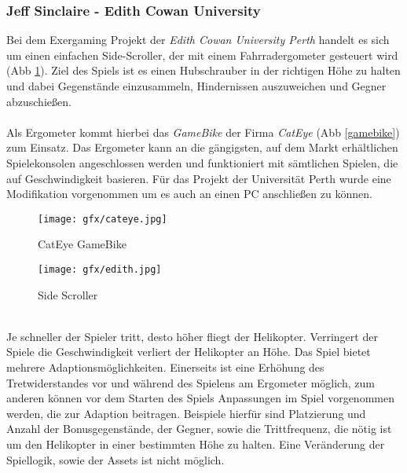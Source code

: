 		\subsubsection{Jeff Sinclaire - Edith Cowan University}
			Bei dem Exergaming Projekt der \textit{Edith Cowan University Perth} \cite{5716909} handelt es sich um einen einfachen Side-Scroller, der mit einem Fahrradergometer gesteuert wird (Abb \ref{sidescroller}). Ziel des Spiels ist es einen 						Hubschrauber in der richtigen Höhe zu halten und dabei Gegenstände einzusammeln, Hindernissen 						auszuweichen und Gegner abzuschießen. 
			\\ \\
			Als Ergometer kommt hierbei das \textit{GameBike} der Firma \textit{CatEye} (Abb \ref{gamebike}) zum Einsatz. Das 					Ergometer kann an die gängigsten, auf dem Markt erhältlichen Spielekonsolen angeschlossen werden und funktioniert mit sämtlichen Spielen, die auf Geschwindigkeit basieren. Für das Projekt der Universität Perth wurde eine Modifikation vorgenommen um es auch an einen PC anschließen zu können.
			\begin{figure}[h]
  				\centering
  				\begin{minipage}[b]{6 cm}
   	 				\texttt{[image: gfx/cateye.jpg]} 
    					\caption{CatEye GameBike}
    					\label{gamebike}
  				\end{minipage}
				\begin{minipage}[b]{6 cm}
    					\texttt{[image: gfx/edith.jpg]}  
    					\caption{Side Scroller}
    					\label{sidescroller}
  				\end{minipage}
			\end{figure}
\\
			Je schneller der Spieler tritt, desto höher fliegt der Helikopter. Verringert der Spiele die Geschwindigkeit 					verliert der Helikopter an Höhe. Das Spiel bietet mehrere Adaptionsmöglichkeiten. Einerseits ist eine Erhöhung 				des Tretwiderstandes vor und während des Spielens am Ergometer möglich, zum anderen können vor dem 					Starten des Spiels Anpassungen im Spiel vorgenommen werden, die zur Adaption beitragen. Beispiele hierfür 				sind Platzierung und Anzahl der Bonusgegenstände, der Gegner, sowie die Trittfrequenz, die nötig ist um den 				Helikopter in einer bestimmten Höhe zu halten. Eine Veränderung der Spiellogik, sowie der Assets ist nicht 					möglich.
